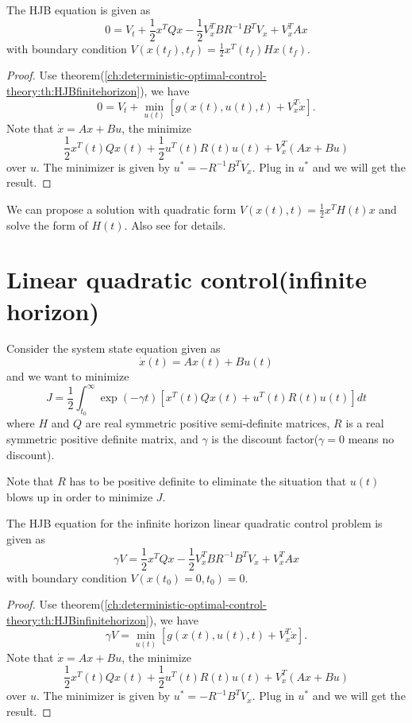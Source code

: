 \begin{refsection}
\begin{theorem}
	
	The HJB equation is given as
	$$0 = V_t + \frac{1}{2}x^TQx- \frac{1}{2}V^{T}_xBR^{-1}B^TV_x+V^{T}_xAx$$ with boundary condition $V(x(t_f),t_f) = \frac{1}{2}x^T(t_f)Hx(t_f)$.
\end{theorem}
\begin{proof}
Use theorem(\autoref{ch:deterministic-optimal-control-theory:th:HJBfinitehorizon}), we have
$$0 = V_t + \min_{u(t)}[ g(x(t),u(t),t) + V_x^T\dot{x}].$$
Note that $\dot{x} = Ax + Bu$, the minimize 
$$\frac{1}{2}x^T(t)Qx(t) + \frac{1}{2}u^T(t)R(t)u(t) + V_x^T(Ax+Bu)$$
over $u$.
The minimizer is given by $u^* = -R^{-1}B^TV_x$.
Plug in $u^*$ and we will get the result.
	
	
	
\end{proof}

\begin{remark}
We can propose a solution with quadratic form $V(x(t),t) = \frac{1}{2}x^TH(t)x$ and solve the form of $H(t)$.
 Also see \cite[93]{kirk2012optimal} for details. 	
\end{remark}



\section{Linear quadratic control(infinite horizon)}

\begin{definition}
Consider the system state equation given as
$$\dot{x}(t) = Ax(t) + Bu(t)$$
and we want to minimize
$$J = \frac{1}{2}\int_{t_0}^{\infty}\exp(-\gamma t)[ x^T(t)Qx(t) + u^T(t)R(t)u(t)] dt$$
where $H$ and $Q$ are real symmetric positive semi-definite matrices, $R$ is a real symmetric positive definite matrix, and $\gamma$ is the discount factor($\gamma = 0$ means no discount).	
\end{definition}


\begin{remark}
Note that $R$ has to be positive definite to eliminate the situation that $u(t)$ blows up in order to minimize $J$.
\end{remark}



\begin{theorem}
The HJB equation for the infinite horizon linear quadratic control problem is given as
$$\gamma V = \frac{1}{2}x^TQx- \frac{1}{2}V^{T}_xBR^{-1}B^TV_x+V^{T}_xAx$$ with boundary condition $V(x(t_0) = 0 ,t_0) = 0$.  
\end{theorem}
\begin{proof}
	Use theorem(\autoref{ch:deterministic-optimal-control-theory:th:HJBinfinitehorizon}), we have
	$$\gamma V =\min_{u(t)}[ g(x(t),u(t),t) + V_x^T\dot{x}].$$
	Note that $\dot{x} = Ax + Bu$, the minimize 
	$$\frac{1}{2}x^T(t)Qx(t) + \frac{1}{2}u^T(t)R(t)u(t) + V_x^T(Ax+Bu)$$
	over $u$.
	The minimizer is given by $u^* = -R^{-1}B^TV_x$.
	Plug in $u^*$ and we will get the result.	
\end{proof}


\end{refsection}
